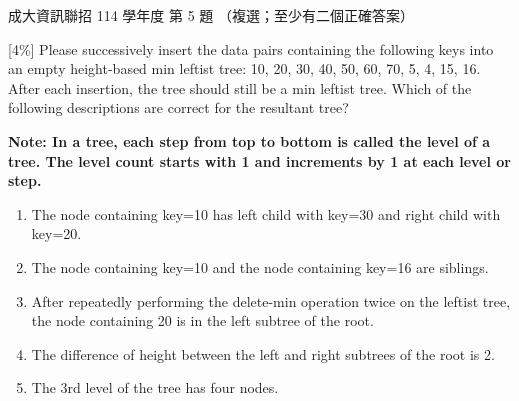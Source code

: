 \begin{pastexam}[label={px:ncku-114-prog-05}]{成大資訊聯招 114 學年度 第 5 題}
（複選；至少有二個正確答案）

{[4\%]} Please successively insert the data pairs containing the following keys into an empty height-based min leftist tree: 10, 20, 30, 40, 50, 60, 70, 5, 4, 15, 16. After each insertion, the tree should still be a min leftist tree. Which of the following descriptions are correct for the resultant tree?

\textbf{Note: In a tree, each step from top to bottom is called the level of a tree. The level count starts with 1 and increments by 1 at each level or step.}
\begin{enumerate}[label=(\Alph*)]
\item The node containing key=10 has left child with key=30 and right child with key=20.
\item The node containing key=10 and the node containing key=16 are siblings.
\item After repeatedly performing the delete-min operation twice on the leftist tree, the node containing 20 is in the left subtree of the root.
\item The difference of height between the left and right subtrees of the root is 2.
\item The 3rd level of the tree has four nodes.
\end{enumerate}
\end{pastexam}

